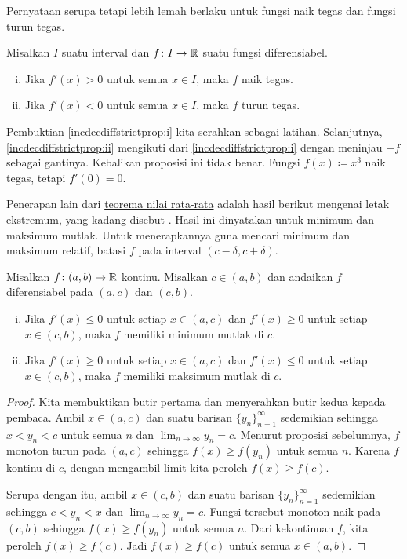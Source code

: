 Pernyataan serupa tetapi lebih lemah berlaku untuk fungsi naik tegas dan
fungsi turun tegas.

\begin{prop} \label{incdecdiffstrictprop}
Misalkan $I$ suatu interval dan
$f \colon I \to {\mathbb{R}}$ suatu fungsi diferensiabel.
\begin{enumerate}[(i)]
\item
\label{incdecdiffstrictprop:i}
Jika $f'(x) > 0$ untuk semua $x \in I$, maka
$f$ naik tegas.
\item
\label{incdecdiffstrictprop:ii}
Jika $f'(x) < 0$ untuk semua $x \in I$,
maka $f$ turun tegas.
\end{enumerate}
\end{prop}

Pembuktian
\ref{incdecdiffstrictprop:i}
kita serahkan sebagai latihan.
Selanjutnya, \ref{incdecdiffstrictprop:ii}
mengikuti dari 
\ref{incdecdiffstrictprop:i} dengan meninjau $-f$
sebagai gantinya.
Kebalikan proposisi ini tidak benar.  Fungsi
$f(x) \coloneqq x^3$ naik tegas, tetapi $f'(0) = 0$.

\medskip

Penerapan lain dari \hyperref[thm:mvt]{teorema nilai rata-rata} adalah hasil berikut mengenai
letak ekstremum, yang kadang disebut
\emph{}.
Hasil ini dinyatakan untuk minimum dan maksimum mutlak.
Untuk menerapkannya guna mencari minimum
dan maksimum relatif, batasi $f$ pada interval $(c-\delta,c+\delta)$.

\begin{prop} \label{firstderminmaxtest}
Misalkan $f \colon (a,b) \to {\mathbb{R}}$ kontinu.  Misalkan $c \in (a,b)$
dan andaikan
$f$ diferensiabel pada $(a,c)$ dan $(c,b)$.
\begin{enumerate}[(i)]
\item Jika $f'(x) \leq 0$ untuk setiap $x \in (a,c)$ dan
 $f'(x) \geq 0$ untuk setiap $x \in (c,b)$, maka $f$ memiliki minimum mutlak 
di $c$.
\item Jika $f'(x) \geq 0$ untuk setiap $x \in (a,c)$ dan
 $f'(x) \leq 0$ untuk setiap $x \in (c,b)$, maka $f$ memiliki maksimum mutlak
di $c$.
\end{enumerate}
\end{prop}

\begin{proof}
Kita membuktikan butir pertama dan menyerahkan butir kedua kepada pembaca.
Ambil $x \in (a,c)$
dan suatu barisan $\{ y_n\}_{n=1}^\infty$ sedemikian sehingga $x < y_n < c$ untuk semua $n$
dan $\lim_{n\to\infty} y_n = c$.
Menurut proposisi sebelumnya,
$f$ monoton turun pada $(a,c)$ sehingga $f(x) \geq f(y_n)$ untuk semua $n$.
Karena $f$
kontinu di $c$, dengan mengambil limit kita peroleh
$f(x) \geq f(c)$.

Serupa dengan itu, ambil $x \in (c,b)$
dan suatu barisan $\{ y_n\}_{n=1}^\infty$ sedemikian sehingga $c < y_n < x$ dan
$\lim_{n\to\infty} y_n = c$.
Fungsi tersebut monoton naik pada $(c,b)$ sehingga $f(x) \geq f(y_n)$ untuk semua $n$.
Dari kekontinuan $f$, kita peroleh
$f(x) \geq f(c)$.  Jadi $f(x) \geq f(c)$ untuk semua
$x \in (a,b)$.
\end{proof}


